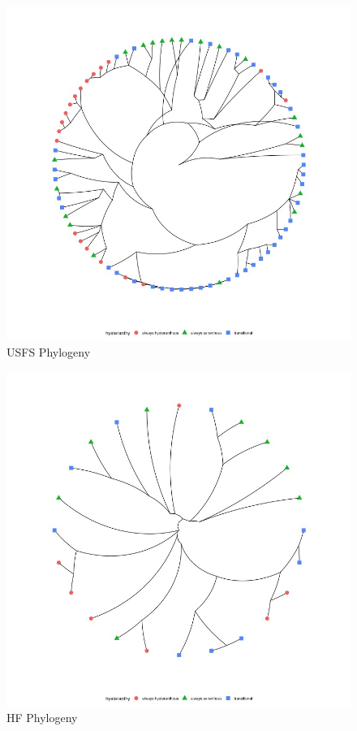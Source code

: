 \documentclass[12pt]{article}\usepackage[]{graphicx}\usepackage[]{color}
\begin{document}
     \begin{figure}
    \centering
    \includegraphics[height=.4\textheight]{..//figure/silvtreeplot.jpeg}
    \caption{USFS Phylogeny}
    \label{fig:Figure 9}
    \end{figure}
    
    \begin{figure}
    \centering
    \includegraphics[height=.4\textheight]{..//figure/HFtreeplot.jpeg}
    \caption{HF Phylogeny}
    \label{fig:Figure 10}
    \end{figure}
\end{document}
